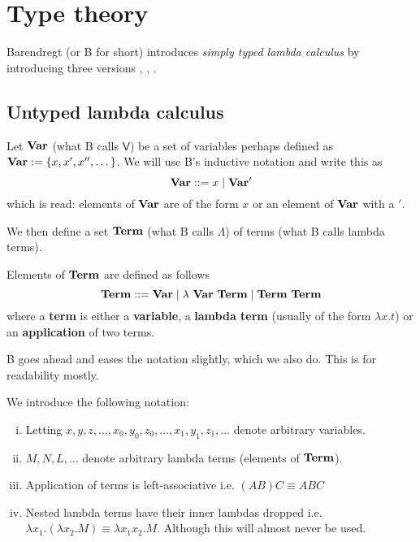 
\section{Type theory}

Barendregt \cite{BarendregtHenk2013Lcwt} (or B for short) introduces {\it simply typed lambda calculus} by introducing three versions \stcu, \stch, \stdb.



\subsection{Untyped lambda calculus}

\begin{defin}

    Let $\mathbf{Var}$ (what B calls $\mathsf{V}$) be a set of variables perhaps defined as $\mathbf{Var} := \{x, x', x'', \dots\}$. We will use B's inductive notation and write this as $$\mathbf{Var}::= x \mid \mathbf{Var} '$$
    which is read: elements of $\mathbf{Var}$ are of the form $x$ or an element of $\mathbf{Var}$ with a $'$.

\end{defin}

We then define a set $\mathbf{Term}$ (what B calls $\Lambda$) of terms (what B calls lambda terms). 

\begin{defin}

    Elements of $\mathbf{Term}$ are defined as follows $$\Tm ::= \Var \mid \lambda\ \Var\ \Tm \mid \Tm\ \Tm$$
    where a {\bf term} is either a {\bf variable}, a {\bf lambda term} (usually of the form $\lambda x.t$) or an {\bf application} of two terms.

\end{defin}

B goes ahead and eases the notation slightly, which we also do. This is for readability mostly.


\begin{remark}
    We introduce the following notation:

    \begin{enumerate}[(i)]
        \item Letting $x,y,z, \dots, x_0,y_0,z_0, \dots, x_1,y_1,z_1,\dots$ denote arbitrary variables.
        \item $M,N,L,\dots$ denote arbitrary lambda terms (elements of $\mathbf{Term}$).
        \item Application of terms is left-associative i.e. $(AB)C \equiv ABC$
        \item Nested lambda terms have their inner lambdas dropped i.e. $\lambda x_1.(\lambda x_2.M) \equiv \lambda x_1 x_2.M$. Although this will almost never be used.
    \end{enumerate}

\end{remark}

